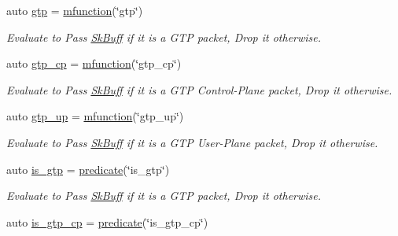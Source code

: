 \begin{DoxyCompactItemize}
\item 
auto \hyperlink{namespacepfq_1_1lang_1_1experimental_1_1anonymous__namespace_02experimental_8hpp_03_abd26824e1b0e6a31ddbba793b727ef8f}{gtp} = \hyperlink{namespacepfq_1_1lang_a1aacba4a159b6c2ddf275bd1fec19ec2}{mfunction}(\char`\"{}gtp\char`\"{})
\begin{DoxyCompactList}\small\item\em Evaluate to {\ttfamily Pass} \hyperlink{structpfq_1_1lang_1_1SkBuff}{Sk\+Buff} if it is a G\+T\+P packet, {\ttfamily Drop} it otherwise. \end{DoxyCompactList}\item 
auto \hyperlink{namespacepfq_1_1lang_1_1experimental_1_1anonymous__namespace_02experimental_8hpp_03_a209a0ce5245cb37a38e0e4c6616e3604}{gtp\+\_\+cp} = \hyperlink{namespacepfq_1_1lang_a1aacba4a159b6c2ddf275bd1fec19ec2}{mfunction}(\char`\"{}gtp\+\_\+cp\char`\"{})
\begin{DoxyCompactList}\small\item\em Evaluate to {\ttfamily Pass} \hyperlink{structpfq_1_1lang_1_1SkBuff}{Sk\+Buff} if it is a G\+T\+P Control-\/\+Plane packet, {\ttfamily Drop} it otherwise. \end{DoxyCompactList}\item 
auto \hyperlink{namespacepfq_1_1lang_1_1experimental_1_1anonymous__namespace_02experimental_8hpp_03_ac8b95a754c8c3bbef4847904eaf6cb9b}{gtp\+\_\+up} = \hyperlink{namespacepfq_1_1lang_a1aacba4a159b6c2ddf275bd1fec19ec2}{mfunction}(\char`\"{}gtp\+\_\+up\char`\"{})
\begin{DoxyCompactList}\small\item\em Evaluate to {\ttfamily Pass} \hyperlink{structpfq_1_1lang_1_1SkBuff}{Sk\+Buff} if it is a G\+T\+P User-\/\+Plane packet, {\ttfamily Drop} it otherwise. \end{DoxyCompactList}\item 
auto \hyperlink{namespacepfq_1_1lang_1_1experimental_1_1anonymous__namespace_02experimental_8hpp_03_a2eb9e54a6fc6170b246cf3149445a2c4}{is\+\_\+gtp} = \hyperlink{namespacepfq_1_1lang_aca9adafc436b7f851621b979fa1aaf88}{predicate}(\char`\"{}is\+\_\+gtp\char`\"{})
\begin{DoxyCompactList}\small\item\em Evaluate to {\ttfamily Pass} \hyperlink{structpfq_1_1lang_1_1SkBuff}{Sk\+Buff} if it is a G\+T\+P packet, {\ttfamily Drop} it otherwise. \end{DoxyCompactList}\item 
auto \hyperlink{namespacepfq_1_1lang_1_1experimental_1_1anonymous__namespace_02experimental_8hpp_03_ade25d79513e3131a54a05e23d25a7539}{is\+\_\+gtp\+\_\+cp} = \hyperlink{namespacepfq_1_1lang_aca9adafc436b7f851621b979fa1aaf88}{predicate}(\char`\"{}is\+\_\+gtp\+\_\+cp\char`\"{})

\end{DoxyCompactItemize}
